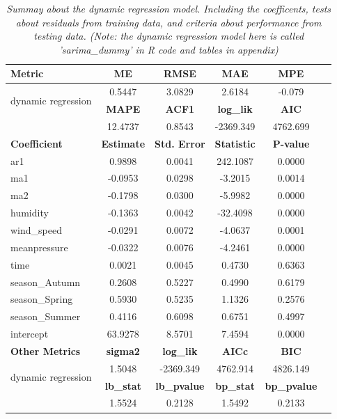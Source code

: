 \documentclass[12pt]{article}
\begin{document}
\begin{table}[!h]
    \centering
    \captionsetup{font=small} %
    \caption{\textit{Summay about the dynamic regression model.
    Including the coefficents, tests about residuals from training data,
    and criteria about performance from testing data.
    (Note: the dynamic regression model here is called 'sarima\_dummy' in R code
     and tables in appendix)}}
    \label{tab:model_summary_combined}
    \begin{tabular}{lccccc}
    \toprule
    \textbf{Metric} & \textbf{ME} & \textbf{RMSE} & \textbf{MAE} & \textbf{MPE} \\
    \midrule
    \multirow{2}{*}{dynamic regression}
        & 0.5447 & 3.0829 & 2.6184 & -0.079 \\
        \cmidrule{2-5}
        & \textbf{MAPE} & \textbf{ACF1} & \textbf{log\_lik} & \textbf{AIC} \\
    \cmidrule{2-5}
        & 12.4737 & 0.8543 & -2369.349 & 4762.699 \\
    \midrule
    \textbf{Coefficient} & \textbf{Estimate} & \textbf{Std. Error} & \textbf{Statistic} & \textbf{P-value} \\
    \cmidrule{1-5}
    ar1            & 0.9898  & 0.0041 & 242.1087 & 0.0000 \\
    ma1            & -0.0953 & 0.0298 & -3.2015  & 0.0014 \\
    ma2            & -0.1798 & 0.0300 & -5.9982  & 0.0000 \\
    humidity       & -0.1363 & 0.0042 & -32.4098 & 0.0000 \\
    wind\_speed    & -0.0291 & 0.0072 & -4.0637  & 0.0001 \\
    meanpressure   & -0.0322 & 0.0076 & -4.2461  & 0.0000 \\
    time           & 0.0021  & 0.0045 & 0.4730   & 0.6363 \\
    season\_Autumn & 0.2608  & 0.5227 & 0.4990   & 0.6179 \\
    season\_Spring & 0.5930  & 0.5235 & 1.1326   & 0.2576 \\
    season\_Summer & 0.4116  & 0.6098 & 0.6751   & 0.4997 \\
    intercept      & 63.9278 & 8.5701 & 7.4594   & 0.0000 \\
    \midrule
    \textbf{Other Metrics} & \textbf{sigma2} & \textbf{log\_lik} & \textbf{AICc} & \textbf{BIC} \\
    \cmidrule{1-5}
    \multirow{2}{*}{dynamic regression} & 1.5048 & -2369.349 & 4762.914 & 4826.149  \\
    \cmidrule{2-5}
     & \textbf{lb\_stat} & \textbf{lb\_pvalue} & \textbf{bp\_stat} & \textbf{bp\_pvalue} \\
     \cmidrule{2-5}
     & 1.5524 & 0.2128 & 1.5492 & 0.2133 \\
    \bottomrule
    \end{tabular}
\end{table}
\end{document}
